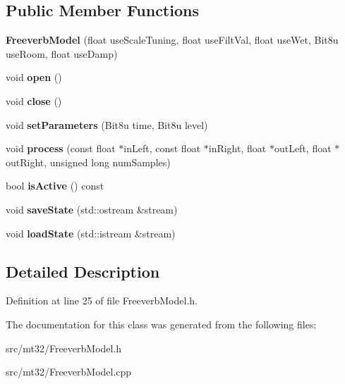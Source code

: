\subsection*{Public Member Functions}
\begin{DoxyCompactItemize}
\item 
\hypertarget{classMT32Emu_1_1FreeverbModel_a94856214a7012134c104f08f52c12959}{{\bfseries Freeverb\-Model} (float use\-Scale\-Tuning, float use\-Filt\-Val, float use\-Wet, Bit8u use\-Room, float use\-Damp)}\label{classMT32Emu_1_1FreeverbModel_a94856214a7012134c104f08f52c12959}

\item 
\hypertarget{classMT32Emu_1_1FreeverbModel_a5ea3f0f227e0a0f1980956970dcb3723}{void {\bfseries open} ()}\label{classMT32Emu_1_1FreeverbModel_a5ea3f0f227e0a0f1980956970dcb3723}

\item 
\hypertarget{classMT32Emu_1_1FreeverbModel_ade83202e6f2813e3f6716efb3157fe48}{void {\bfseries close} ()}\label{classMT32Emu_1_1FreeverbModel_ade83202e6f2813e3f6716efb3157fe48}

\item 
\hypertarget{classMT32Emu_1_1FreeverbModel_aa0317896fca69f935ca6e474da593d07}{void {\bfseries set\-Parameters} (Bit8u time, Bit8u level)}\label{classMT32Emu_1_1FreeverbModel_aa0317896fca69f935ca6e474da593d07}

\item 
\hypertarget{classMT32Emu_1_1FreeverbModel_a4cc4d819d73801abdd6a18d252fe20f7}{void {\bfseries process} (const float $\ast$in\-Left, const float $\ast$in\-Right, float $\ast$out\-Left, float $\ast$out\-Right, unsigned long num\-Samples)}\label{classMT32Emu_1_1FreeverbModel_a4cc4d819d73801abdd6a18d252fe20f7}

\item 
\hypertarget{classMT32Emu_1_1FreeverbModel_a15c933a5ffe0fea16f00fc1ec28a60de}{bool {\bfseries is\-Active} () const }\label{classMT32Emu_1_1FreeverbModel_a15c933a5ffe0fea16f00fc1ec28a60de}

\item 
\hypertarget{classMT32Emu_1_1FreeverbModel_ae1fe99886f3e7faf507fe72a0f3adc8c}{void {\bfseries save\-State} (std\-::ostream \&stream)}\label{classMT32Emu_1_1FreeverbModel_ae1fe99886f3e7faf507fe72a0f3adc8c}

\item 
\hypertarget{classMT32Emu_1_1FreeverbModel_a29107d2c5b015a0f962f077eb3a15a35}{void {\bfseries load\-State} (std\-::istream \&stream)}\label{classMT32Emu_1_1FreeverbModel_a29107d2c5b015a0f962f077eb3a15a35}

\end{DoxyCompactItemize}


\subsection{Detailed Description}


Definition at line 25 of file Freeverb\-Model.\-h.



The documentation for this class was generated from the following files\-:\begin{DoxyCompactItemize}
\item 
src/mt32/Freeverb\-Model.\-h\item 
src/mt32/Freeverb\-Model.\-cpp\end{DoxyCompactItemize}
